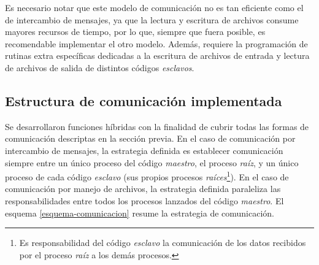 
Es necesario notar que este modelo de comunicación no es tan eficiente como el de intercambio de mensajes,
ya que la lectura y escritura de archivos consume mayores recursos de tiempo, por lo que, siempre que fuera posible, es recomendable implementar el otro modelo.
Además, requiere la programación de rutinas extra específicas dedicadas a la escritura de archivos de entrada y lectura de archivos de salida de distintos códigos \textit{esclavos}.

\subsection*{Estructura de comunicación implementada}
\label{2:estructura}

Se desarrollaron funciones híbridas con la finalidad de cubrir todas las formas de comunicación descriptas en la sección previa.
En el caso de comunicación por intercambio de mensajes, 
la estrategia definida es establecer comunicación siempre entre un único proceso del código \textit{maestro}, el proceso \textit{raíz},
y un único proceso de cada código \textit{esclavo} (sus propios procesos \textit{raíces}\footnote{
Es responsabilidad del código \textit{esclavo} la comunicación de los datos recibidos por el proceso \textit{raíz} a los demás procesos.
}).
En el caso de comunicación por manejo de archivos,
la estrategia definida paraleliza las responsabilidades entre todos los procesos lanzados del código \textit{maestro}.
El esquema \ref{esquema-comunicacion} resume la estrategia de comunicación.

